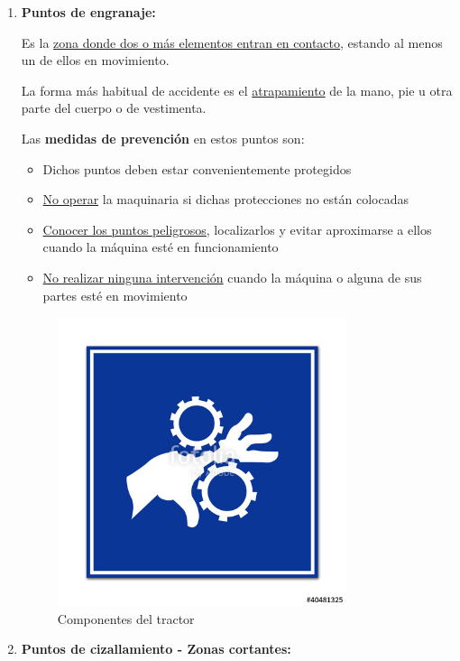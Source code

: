 \documentclass[a4paper,12pt,oneside]{book}
\begin{document}
\begin{enumerate}
\item \textbf{Puntos de engranaje:}
\label{sec:org395dc93}

Es la \uline{zona donde dos o más elementos entran en contacto}, estando al menos un
de ellos en movimiento.

La forma más habitual de accidente es el \uline{atrapamiento} de la mano, pie u otra
parte del cuerpo o de vestimenta.

Las \textbf{medidas de prevención} en estos puntos son:
\begin{itemize}
\item Dichos puntos deben estar convenientemente protegidos
\item \uline{No operar} la maquinaria si dichas protecciones no están colocadas
\item \uline{Conocer los puntos peligrosos}, localizarlos y evitar aproximarse a ellos
cuando la máquina esté en funcionamiento
\item \uline{No realizar ninguna intervención} cuando la máquina o alguna de sus partes
esté en movimiento
\end{itemize}

\begin{figure}[htbp]
\centering
\includegraphics[width=0.8\textwidth]{./img_0009/riesgo_engranaje.jpg}
\caption{Componentes del tractor}
\end{figure}

\item \textbf{Puntos de cizallamiento - Zonas cortantes:}
\label{sec:org3dc88d8}


\end{enumerate}
\end{document}
